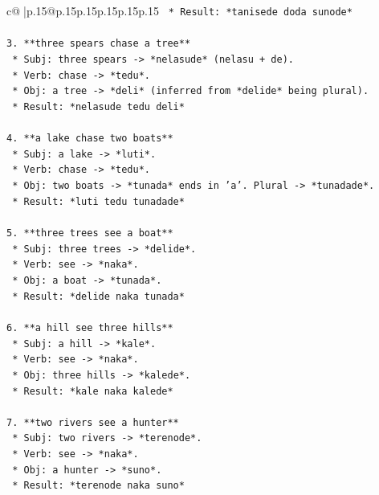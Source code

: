 \documentclass{article}
\begin{document}
{\begin{supertabular}{c@{$\;$}|p{.15\linewidth}@{}p{.15\linewidth}p{.15\linewidth}p{.15\linewidth}p{.15\linewidth}p{.15\linewidth}}
{{{\texttt{    *   Result: *tanisede doda sunode*} \\
\\ 
\texttt{3.  **three spears chase a tree**} \\
\texttt{    *   Subj: three spears {-}> *nelasude* (nelasu + de).} \\
\texttt{    *   Verb: chase {-}> *tedu*.} \\
\texttt{    *   Obj: a tree {-}> *deli* (inferred from *delide* being plural).} \\
\texttt{    *   Result: *nelasude tedu deli*} \\
\\ 
\texttt{4.  **a lake chase two boats**} \\
\texttt{    *   Subj: a lake {-}> *luti*.} \\
\texttt{    *   Verb: chase {-}> *tedu*.} \\
\texttt{    *   Obj: two boats {-}> *tunada* ends in 'a'. Plural {-}> *tunadade*.} \\
\texttt{    *   Result: *luti tedu tunadade*} \\
\\ 
\texttt{5.  **three trees see a boat**} \\
\texttt{    *   Subj: three trees {-}> *delide*.} \\
\texttt{    *   Verb: see {-}> *naka*.} \\
\texttt{    *   Obj: a boat {-}> *tunada*.} \\
\texttt{    *   Result: *delide naka tunada*} \\
\\ 
\texttt{6.  **a hill see three hills**} \\
\texttt{    *   Subj: a hill {-}> *kale*.} \\
\texttt{    *   Verb: see {-}> *naka*.} \\
\texttt{    *   Obj: three hills {-}> *kalede*.} \\
\texttt{    *   Result: *kale naka kalede*} \\
\\ 
\texttt{7.  **two rivers see a hunter**} \\
\texttt{    *   Subj: two rivers {-}> *terenode*.} \\
\texttt{    *   Verb: see {-}> *naka*.} \\
\texttt{    *   Obj: a hunter {-}> *suno*.} \\
\texttt{    *   Result: *terenode naka suno*} \\
\\ 
}}}
\end{supertabular}}
\end{document}
